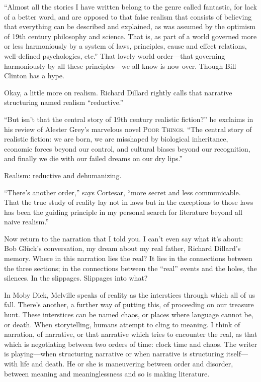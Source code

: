 \documentclass[
]{memoir}
\begin{document}
``Almost all the stories I have written belong to the genre called
fantastic, for lack of a better word, and are opposed to that false
realism that consists of believing that everything can be described and
explained, as was assumed by the optimism of 19th century philosophy and
science. That is, as part of a world governed more or less harmoniously
by a system of laws, principles, cause and effect relations,
well-defined psychologies, etc.'' That lovely world order---that
governing harmoniously by all these principles---we all know is now
over. Though Bill Clinton has a hype.

Okay, a little more on realism. Richard Dillard rightly calls that
narrative structuring named realism ``reductive.''

``But isn't that the central story of 19th century realistic fiction?''
he exclaims in his review of Alester Grey's marvelous novel \textsc{Poor
Things}. ``The central story of realistic fiction: we are born, we are
misshaped by biological inheritance, economic forces beyond our control,
and cultural biases beyond our recognition, and finally we die with our
failed dreams on our dry lips.''

Realism: reductive and dehumanizing.

``There's another order,'' says Cortesar, ``more secret and less
communicable. That the true study of reality lay not in laws but in the
exceptions to those laws has been the guiding principle in my personal
search for literature beyond all naive realism.''

Now return to the narration that I told you. I can't even say what it's
about: Bob Glück's conversation, my dream about my real father, Richard
Dillard's memory. Where in this narration lies the real? It lies in the
connections between the three sections; in the connections between the
``real'' events and the holes, the silences. In the slippages. Slippages
into what?

In Moby Dick, Melville speaks of reality as the interstices through
which all of us fall. There's another, a further way of putting this, of
proceeding on our treasure hunt. These interstices can be named chaos,
or places where language cannot be, or death. When storytelling, humans
attempt to cling to meaning. I think of narration, of narrative, or that
narrative which tries to encounter the real, as that which is
negotiating between two orders of time: clock time and chaos. The writer
is playing---when structuring narrative or when narrative is structuring
itself---with life and death. He or she is maneuvering between order and
disorder, between meaning and meaninglessness and so is making
literature.
\end{document}
